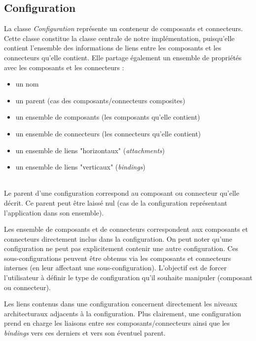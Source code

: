 		\subsection{Configuration}
        	La classe \emph{Configuration} représente un conteneur de composants et connecteurs. Cette classe constitue la classe centrale de notre implémentation, puisqu'elle contient l'ensemble des informations de liens entre les composants et les connecteurs qu'elle contient.
            Elle partage également un ensemble de propriétés avec les composants et les connecteurs : 
            \begin{itemize}
            	\item un nom
                \item un parent (cas des composants/connecteurs composites)
                \item un ensemble de composants (les composants qu'elle contient)
                \item un ensemble de connecteurs (les connecteurs qu'elle contient)
                \item un ensemble de liens "horizontaux" (\emph{attachments})
                \item un ensemble de liens "verticaux" (\emph{bindings})
            \end{itemize}
            ~\\
            
            Le parent d'une configuration correspond au composant ou connecteur qu'elle décrit. Ce parent peut être laissé nul (cas de la configuration représentant l'application dans son ensemble).
            \newline
            
            Les ensemble de composants et de connecteurs correspondent aux composants et connecteurs directement inclus dans la configuration. On peut noter qu'une configuration ne peut pas explicitement contenir une autre configuration. Ces sous-configurations peuvent être obtenus via les composants et connecteurs internes (en leur affectant une sous-configuration). L'objectif est de forcer l'utilisateur à définir le type de configuration qu'il souhaite manipuler (composant ou connecteur).
            \newline
            
            Les liens contenus dans une configuration concernent directement les niveaux architecturaux adjacents à la configuration. Plus clairement, une configuration prend en charge les liaisons entre ses composants/connecteurs ainsi que les \emph{bindings} vers ces derniers et vers son éventuel parent.
            
